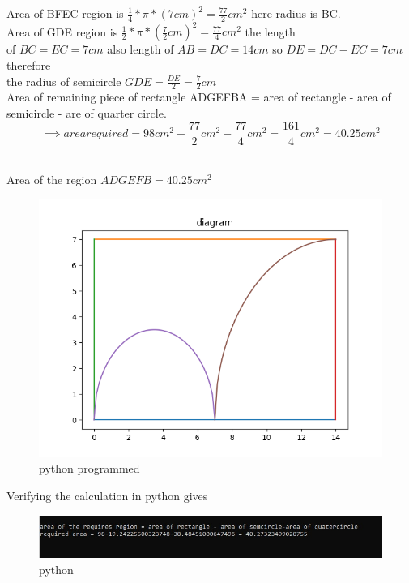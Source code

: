 \documentclass{article}
\begin{document}
Area of BFEC region is $\frac{1}{4}*\pi*(7cm)^2 = \frac{77}{2}cm^2 $ here radius is BC.\\

Area of GDE region is $\frac{1}{2}*\pi*(\frac{7}{2}cm)^2= \frac{77}{4}cm^2$ the length\\ 
of $BC = EC = 7cm$ also length of $AB = DC = 14cm$ so $DE = DC - EC = 7cm$ therefore\\
the radius of semicircle $GDE = \frac{DE}{2} = \frac{7}{2}cm$\\

Area of remaining piece of rectangle ADGEFBA = area of rectangle - area of semicircle - are of quarter circle.\\
$$\implies area required =98cm^{2} - \frac{77}{2}cm^{2} - \frac{77}{4}cm^{2} = \frac{161}{4}cm^{2} = 40.25cm^{2} $$ \\
\begin{center}
 \therefore Area  of the region $ ADGEFB = 40.25cm^2$    
\end{center}

\begin{figure}[h!]
    \centering
    \includegraphics[scale = 0.5]{Figure_2.png}
    \caption{python programmed}
    \label{fig:my_label}
\end{figure}
\begin{center}
Verifying the calculation in python gives    
\end{center}

\begin{figure}[h!]
    \centering
    \includegraphics[scale = 0.6]{Figure_3.jpg}
    \caption{python}
    \label{fig:my_label}
\end{figure}
\end{document}
